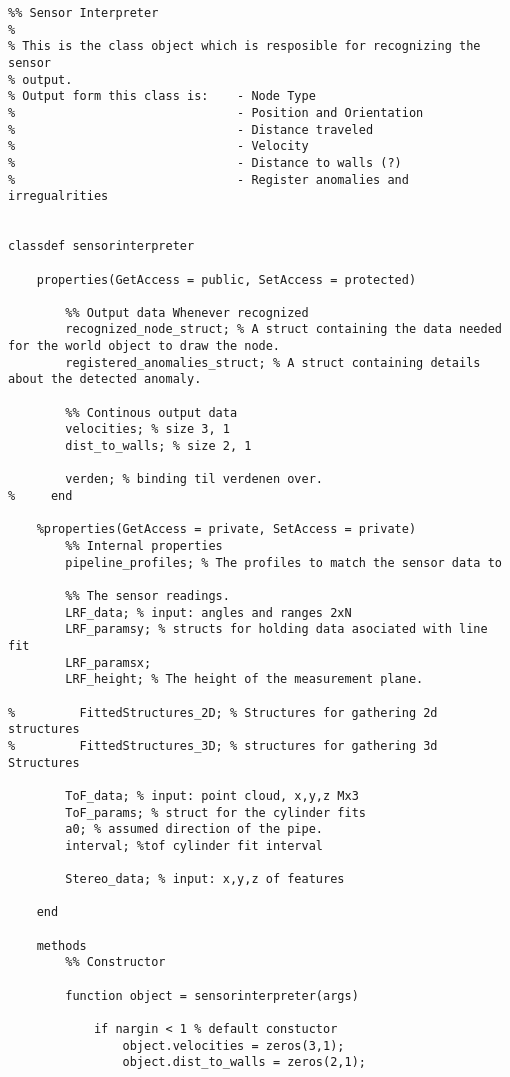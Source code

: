 \begin{lstlisting}
%% Sensor Interpreter
%
% This is the class object which is resposible for recognizing the sensor
% output. 
% Output form this class is:    - Node Type
%                               - Position and Orientation
%                               - Distance traveled
%                               - Velocity
%                               - Distance to walls (?)
%                               - Register anomalies and irregualrities
 
 
classdef sensorinterpreter 
   
    properties(GetAccess = public, SetAccess = protected)
        
        %% Output data Whenever recognized
        recognized_node_struct; % A struct containing the data needed for the world object to draw the node.
        registered_anomalies_struct; % A struct containing details about the detected anomaly.
        
        %% Continous output data
        velocities; % size 3, 1 
        dist_to_walls; % size 2, 1 
        
        verden; % binding til verdenen over.
%     end
    
    %properties(GetAccess = private, SetAccess = private)
        %% Internal properties
        pipeline_profiles; % The profiles to match the sensor data to
    
        %% The sensor readings.
        LRF_data; % input: angles and ranges 2xN
        LRF_paramsy; % structs for holding data asociated with line fit
        LRF_paramsx; 
        LRF_height; % The height of the measurement plane.
        
%         FittedStructures_2D; % Structures for gathering 2d structures
%         FittedStructures_3D; % structures for gathering 3d Structures
        
        ToF_data; % input: point cloud, x,y,z Mx3
        ToF_params; % struct for the cylinder fits
        a0; % assumed direction of the pipe. 
        interval; %tof cylinder fit interval
        
        Stereo_data; % input: x,y,z of features
    
    end
    
    methods
        %% Constructor
        
        function object = sensorinterpreter(args)
           
            if nargin < 1 % default constuctor
                object.velocities = zeros(3,1);
                object.dist_to_walls = zeros(2,1);
                

\end{lstlisting}
